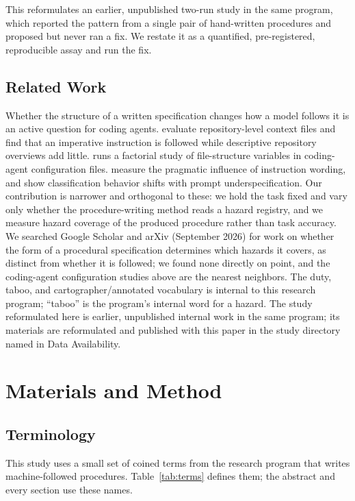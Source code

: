 \documentclass[11pt,a4paper]{article}
\begin{document}
This reformulates an earlier, unpublished two-run study in the same program,
which reported the pattern from a single pair of hand-written procedures and
proposed but never ran a fix. We restate it as a quantified, pre-registered, reproducible assay and
run the fix.

\subsection{Related Work}

Whether the structure of a written specification changes how a model follows it
is an active question for coding agents. \citet{gloaguen2026agents} evaluate
repository-level context files and find that an imperative instruction is
followed while descriptive repository overviews add little. \citet{mcmillan2026instruction}
runs a factorial study of file-structure variables in coding-agent configuration
files. \citet{geng2026measuring} measure the pragmatic influence of instruction
wording, and \citet{pecher2026revisiting} show classification behavior shifts
with prompt underspecification. Our contribution is narrower and orthogonal to
these: we hold the task fixed and vary only whether the procedure-writing method
reads a hazard registry, and we measure hazard coverage of the produced
procedure rather than task accuracy. We searched Google Scholar and arXiv
(September 2026) for work on whether the form of a procedural specification
determines which hazards it covers, as distinct from whether it is followed; we
found none directly on point, and the coding-agent configuration studies above
are the nearest neighbors. The duty, taboo, and cartographer/annotated
vocabulary is internal to this research program; ``taboo'' is the program's
internal word for a hazard. The study reformulated here is earlier, unpublished
internal work in the same program; its materials are reformulated and published
with this paper in the study directory named in Data Availability.

\section{Materials and Method}

\subsection{Terminology}\label{sec:terminology}

This study uses a small set of coined terms from the research program that writes
machine-followed procedures. Table~\ref{tab:terms} defines them; the abstract and
every section use these names.
\end{document}
